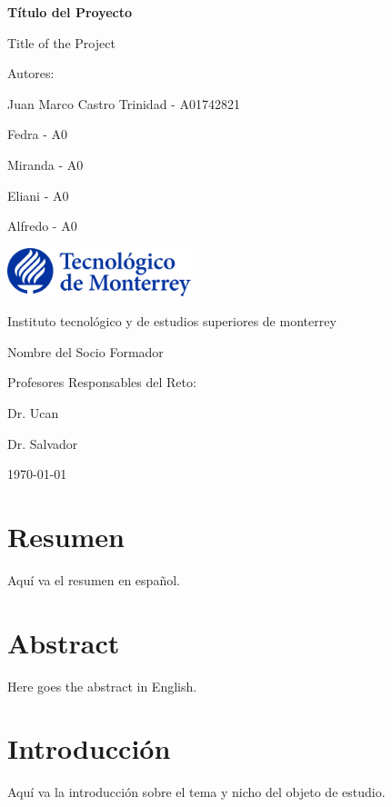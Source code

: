 \documentclass[a4paper,12pt]{report}
\begin{document}
\begin{titlepage}
    \centering
    {\Huge \bfseries Título del Proyecto \par}
    {\Large Title of the Project \par}
    \vspace{1cm}
    {\Large Autores: \par}
    \vspace{0.5cm}
    {\large Juan Marco Castro Trinidad - A01742821 \par}
    {\large Fedra - A0 \par}
    {\large Miranda - A0 \par}
    {\large Eliani - A0 \par}
    {\large Alfredo - A0 \par}
    \vfill
    \includegraphics[width=0.4\textwidth]{logo_tec.png} \par
    \vspace{0.5cm}
    {\Large Instituto tecnológico y de estudios superiores de monterrey  \par}
    {\Large Nombre del Socio Formador \par}
    \vfill
    {\Large Profesores Responsables del Reto: \par}
    {\large Dr. Ucan \par}
    {\large Dr. Salvador \par}
    \vfill
    {\large \today \par}
\end{titlepage}

\tableofcontents
\newpage

\chapter*{Resumen}
Aquí va el resumen en español.

\chapter*{Abstract}
Here goes the abstract in English.

\chapter{Introducción}
Aquí va la introducción sobre el tema y nicho del objeto de estudio.
\end{document}
